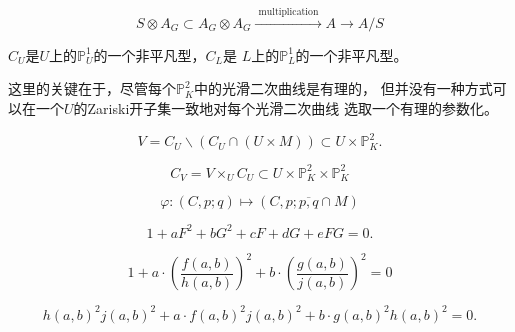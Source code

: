 \[
    S \otimes A_G \subset A_G \otimes A_G \xrightarrow{\text { multiplication }}
     A \longrightarrow A / S
\]



\begin{pro}\label{pro:4.84}
    $C_U$是$U$上的$\mathbb P_U^1$的一个非平凡型，$C_L$是
    $L$上的$\mathbb P_L^1$的一个非平凡型。
\end{pro}

这里的关键在于，尽管每个$\mathbb P_K^2$中的光滑二次曲线是有理的，
但并没有一种方式可以在一个$U$的Zariski开子集一致地对每个光滑二次曲线
选取一个有理的参数化。

\[
    V=C_U \backslash\left(C_U \cap(U \times M)\right) \subset U \times \mathbb{P}_K^2 .
\]

\[
    C_V=V \times_U C_U \subset U \times \mathbb{P}_K^2 \times \mathbb{P}_K^2
\]


\[
    \varphi:(C, p ; q) \longmapsto(C, p ; \overline{p, q} \cap M)
\]


\[
    1+a F^2+b G^2+c F+d G+e F G=0 .
\]

\[
    1+a \cdot\left(\frac{f(a, b)}{h(a, b)}\right)^2+b \cdot\left(\frac{g(a, b)}{j(a, b)}\right)^2=0
\]

\[
    h(a, b)^2 j(a, b)^2+a \cdot f(a, b)^2 j(a, b)^2+b \cdot g(a, b)^2 h(a, b)^2=0 .
\]

\nottran